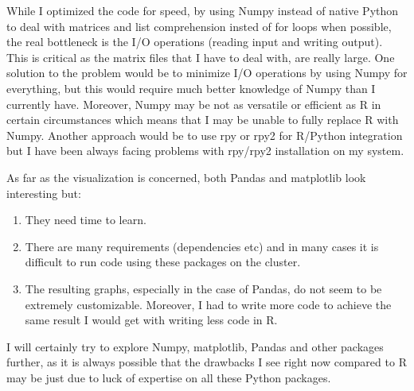 \documentclass[a4paper, 11pt]{article} %
\begin{document}
While I optimized the code for speed, by using Numpy instead of
native Python to deal with matrices and list comprehension insted
of for loops when possible, the real bottleneck is the I/O operations
(reading input and writing output). This is critical as the matrix
files that I have to deal with, are really large. One solution to
the problem would be to minimize I/O operations by using Numpy
for everything, but this would require much better knowledge
of Numpy than I currently have. Moreover, Numpy may be not as versatile
or efficient as R in certain circumstances which means that 
I may be unable to fully replace R with Numpy. Another approach 
would be to use rpy or rpy2 for R/Python integration but I have been
always facing problems with rpy/rpy2 installation on my system.

As far as the visualization is concerned, both Pandas and matplotlib
look interesting but:

\begin{enumerate}
\item They need time to learn.  
\item There are many requirements (dependencies etc) and in many
cases it is difficult to run code using these packages on the cluster.
\item The resulting graphs, especially in the case of Pandas, do not
seem to be extremely customizable. Moreover, I had to write more
code to achieve the same result I would get with writing less
code in R.
\end{enumerate}

I will certainly try to explore Numpy, matplotlib, Pandas and other
packages further, as it is always possible that the drawbacks I see
right now compared to R may be just due to luck of expertise on all
these Python packages. 

\newpage




\end{document}
